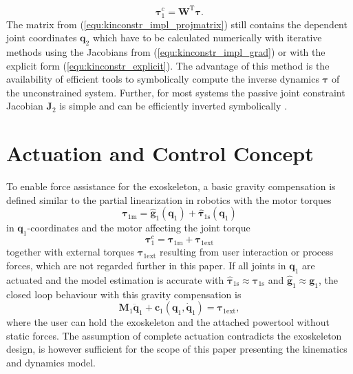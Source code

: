\documentclass[letterpaper, 10 pt, conference]{ieeeconf}  %
\newcommand{\bm}[1]{\boldsymbol{#1}}
\begin{document}
%
\begin{equation}
\bm{\tau}^c_1 = \bm{W}^\mathrm{T} \bm{\tau}.
\label{equ:tau_projection}
\end{equation}
%
The matrix from (\ref{equ:kinconstr_impl_projmatrix}) still contains the dependent joint coordinates $\bm{q}_2$ which have to be calculated numerically with iterative methods using the Jacobians from (\ref{equ:kinconstr_impl_grad}) or with the explicit form (\ref{equ:kinconstr_explicit}).
The advantage of this method is the availability of efficient tools to symbolically compute the inverse dynamics $\bm{\tau}$ of the unconstrained system.
Further, for most systems the passive joint constraint Jacobian $\bm{J}_2$ is simple and can be efficiently inverted symbolically \cite{ParkChoPlo1999}.

\section{Actuation and Control Concept}
\label{sec:actuation_control}

To enable force assistance for the exoskeleton, a basic gravity compensation is defined similar to the partial linearization in robotics with the motor torques
%
\begin{equation}
\bm{\tau}_{1\mathrm{m}} = \hat{\bm{g}}_1(\bm{q}_1) + \hat{\bm{\tau}}_{1\mathrm{s}}(\bm{q}_1)
\label{equ:GravKomp}
\end{equation}
%
in $\bm{q}_1$-coordinates and the motor affecting the joint torque
%
\begin{equation}
\bm{\tau}^c_1 = \bm{\tau}_{1\mathrm{m}} + \bm{\tau}_{1\mathrm{ext}}
\label{equ:JointTorque}
\end{equation}
%
together with external torques $\bm{\tau}_{1\mathrm{ext}}$ resulting from user interaction or process forces, which are not regarded further in this paper.
If all joints in $\bm{q}_1$ are actuated and the model estimation is accurate with $\hat{\bm{\tau}}_{1\mathrm{s}} \approx \bm{\tau}_{1\mathrm{s}}$ and $\hat{\bm{g}}_{1} \approx \bm{g}_{1}$, the closed loop behaviour with this gravity compensation is
%
\begin{equation}
\bm{M}_1\ddot{\bm{q}}_1+\bm{c}_1(\bm{q}_1,\dot{\bm{q}}_1) = \bm{\tau}_{1\mathrm{ext}},
\label{equ:closedloop}
\end{equation}
%
where the user can hold the exoskeleton and the attached powertool without static forces.
The assumption of complete actuation contradicts the exoskeleton design, is however sufficient for the scope of this paper presenting the kinematics and dynamics model.
\end{document}

